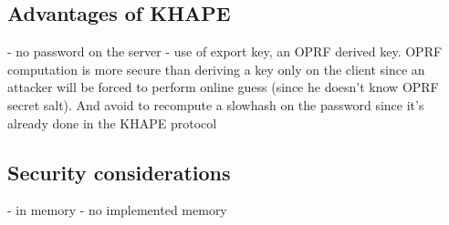 \documentclass[../report.tex]{subfiles}
\begin{document}
\subsection{Advantages of KHAPE}
- no password on the server
- use of export key, an OPRF derived key. OPRF computation is more secure than deriving a key only on the client since an attacker will be forced to perform online guess (since he doesn't know OPRF secret salt). And avoid to recompute a slowhash on the password since it's already done in the KHAPE protocol

\subsection{Security considerations}
- in memory
- no implemented memory
\end{document}
